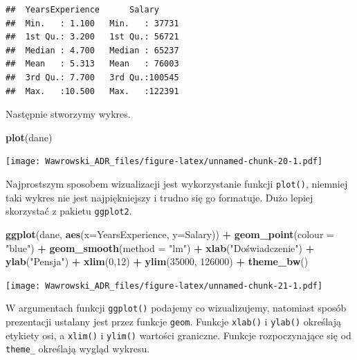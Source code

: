 \documentclass[]{book}
\newenvironment{Shaded}{\begin{snugshade}}{\end{snugshade}}
\newcommand{\DataTypeTok}[1]{\textcolor[rgb]{0.13,0.29,0.53}{#1}}
\newcommand{\DecValTok}[1]{\textcolor[rgb]{0.00,0.00,0.81}{#1}}
\newcommand{\KeywordTok}[1]{\textcolor[rgb]{0.13,0.29,0.53}{\textbf{#1}}}
\newcommand{\NormalTok}[1]{#1}
\newcommand{\OperatorTok}[1]{\textcolor[rgb]{0.81,0.36,0.00}{\textbf{#1}}}
\newcommand{\StringTok}[1]{\textcolor[rgb]{0.31,0.60,0.02}{#1}}
\begin{document}
\begin{verbatim}
##  YearsExperience      Salary      
##  Min.   : 1.100   Min.   : 37731  
##  1st Qu.: 3.200   1st Qu.: 56721  
##  Median : 4.700   Median : 65237  
##  Mean   : 5.313   Mean   : 76003  
##  3rd Qu.: 7.700   3rd Qu.:100545  
##  Max.   :10.500   Max.   :122391
\end{verbatim}

Następnie stworzymy wykres.

\begin{Shaded}
\begin{Highlighting}[]
\KeywordTok{plot}\NormalTok{(dane)}
\end{Highlighting}
\end{Shaded}

\texttt{[image: Wawrowski\_ADR\_files/figure-latex/unnamed-chunk-20-1.pdf]}

Najprostszym sposobem wizualizacji jest wykorzystanie funkcji \texttt{plot()}, niemniej taki wykres nie jest najpiękniejszy i trudno się go formatuje. Dużo lepiej skorzystać z pakietu \texttt{ggplot2}.

\begin{Shaded}
\begin{Highlighting}[]
\KeywordTok{ggplot}\NormalTok{(dane, }\KeywordTok{aes}\NormalTok{(}\DataTypeTok{x=}\NormalTok{YearsExperience, }\DataTypeTok{y=}\NormalTok{Salary)) }\OperatorTok{+}\StringTok{ }
\StringTok{  }\KeywordTok{geom_point}\NormalTok{(}\DataTypeTok{colour =} \StringTok{"blue"}\NormalTok{) }\OperatorTok{+}
\StringTok{  }\KeywordTok{geom_smooth}\NormalTok{(}\DataTypeTok{method =} \StringTok{"lm"}\NormalTok{) }\OperatorTok{+}
\StringTok{  }\KeywordTok{xlab}\NormalTok{(}\StringTok{"Doświadczenie"}\NormalTok{) }\OperatorTok{+}\StringTok{ }
\StringTok{  }\KeywordTok{ylab}\NormalTok{(}\StringTok{"Pensja"}\NormalTok{) }\OperatorTok{+}
\StringTok{  }\KeywordTok{xlim}\NormalTok{(}\DecValTok{0}\NormalTok{,}\DecValTok{12}\NormalTok{) }\OperatorTok{+}
\StringTok{  }\KeywordTok{ylim}\NormalTok{(}\DecValTok{35000}\NormalTok{, }\DecValTok{126000}\NormalTok{) }\OperatorTok{+}
\StringTok{  }\KeywordTok{theme_bw}\NormalTok{()}
\end{Highlighting}
\end{Shaded}

\texttt{[image: Wawrowski\_ADR\_files/figure-latex/unnamed-chunk-21-1.pdf]}

W argumentach funkcji \texttt{ggplot()} podajemy co wizualizujemy, natomiast sposób prezentacji ustalany jest przez funkcje \texttt{geom}. Funkcje \texttt{xlab()} i \texttt{ylab()} określają etykiety osi, a \texttt{xlim()} i \texttt{ylim()} wartości graniczne. Funkcje rozpoczynające się od \texttt{theme\_} określają wygląd wykresu.
\end{document}
